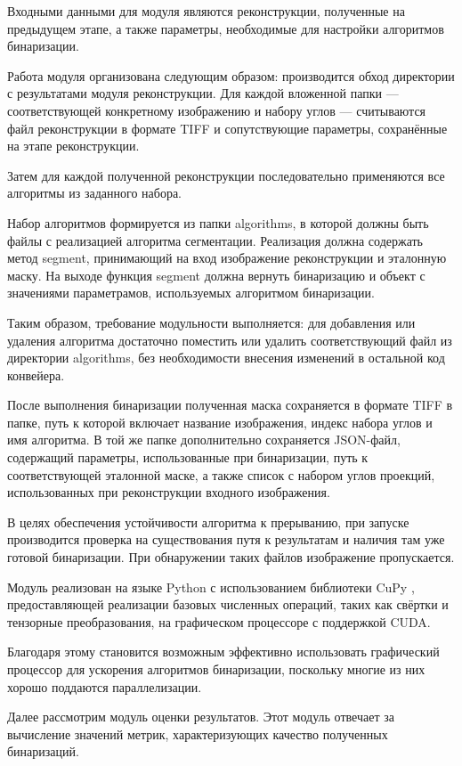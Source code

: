 Входными данными для модуля являются реконструкции, полученные на предыдущем этапе, а также параметры, необходимые для настройки алгоритмов бинаризации.

Работа модуля организована следующим образом: производится обход директории с результатами модуля реконструкции. Для каждой вложенной папки — соответствующей конкретному изображению и набору углов — считываются файл реконструкции в формате TIFF и сопутствующие параметры, сохранённые на этапе реконструкции.

Затем для каждой полученной реконструкции последовательно применяются все алгоритмы из заданного набора.

Набор алгоритмов формируется из папки algorithms, в которой должны быть файлы с реализацией алгоритма сегментации. Реализация должна содержать метод segment, принимающий на вход изображение реконструкции и эталонную маску. На выходе функция segment должна вернуть бинаризацию и объект с значениями параметрамов, используемых алгоритмом бинаризации. 

Таким образом, требование модульности выполняется: для добавления или удаления алгоритма достаточно поместить или удалить соответствующий файл из директории algorithms, без необходимости внесения изменений в остальной код конвейера.

После выполнения бинаризации полученная маска сохраняется в формате TIFF в папке, путь к которой включает название изображения, индекс набора углов и имя алгоритма. В той же папке дополнительно сохраняется JSON-файл, содержащий параметры, использованные при бинаризации, путь к соответствующей эталонной маске, а также список с набором углов проекций, использованных при реконструкции входного изображения.

В целях обеспечения устойчивости алгоритма к прерыванию, при запуске производится проверка на существования путя к результатам и наличия там уже готовой бинаризации. При обнаружении таких файлов изображение пропускается. 

Модуль реализован на языке Python с использованием библиотеки CuPy \cite{cuPy}, предоставляющей реализации базовых численных операций, таких как свёртки и тензорные преобразования, на графическом процессоре с поддержкой CUDA. 

Благодаря этому становится возможным эффективно использовать графический процессор для ускорения алгоритмов бинаризации, поскольку многие из них хорошо поддаются параллелизации.

Далее рассмотрим модуль оценки результатов. Этот модуль отвечает за вычисление значений метрик, характеризующих качество полученных бинаризаций.

